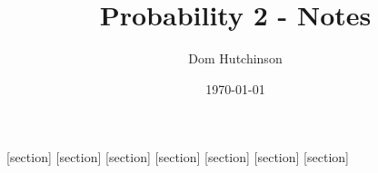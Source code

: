 \documentclass[11pt,a4paper]{article}
\begin{document}
\pagestyle{fancy}
\setlength\parindent{0pt}
\allowdisplaybreaks

\renewcommand{\headrulewidth}{0pt}

\title{Probability 2 - Notes}
\author{Dom Hutchinson}
\date{\today}
\maketitle

\fancyhead[R]{\today}


[section]
[section]
[section]
[section]
[section]
[section]
[section]

\newcommand{\dotprod}[0]{\boldsymbol{\cdot}}
\newcommand{\cosech}[0]{\mathrm{cosech}\ }
\newcommand{\cosec}[0]{\mathrm{cosec}\ }
\newcommand{\sech}[0]{\mathrm{sech}\ }
\newcommand{\expect}[0]{\mathbb{E}}
\newcommand{\nats}[0]{\mathbb{N}}
\newcommand{\prob}[0]{\mathbb{P}}
\newcommand{\reals}[0]{\mathbb{R}}
\newcommand{\sigmafield}[0]{\mathcal{F}}
\newcommand{\nb}[0]{\underline{N.B.} -}
\newcommand{\ie}[0]{\textit{i.e. }}
\newcommand{\eg}[0]{\textit{e.g. }}

\newcommand{\definition}[1]{\stepcounter{definition} \textbf{Definition \arabic{section}.\arabic{definition}\ - }\textit{#1}\\}
\newcommand{\example}[1]{\stepcounter{example} \textbf{Example \arabic{section}.\arabic{example}\ - }\textit{#1}\\}
\newcommand{\notation}[1]{\stepcounter{notation} \textbf{Notation \arabic{section}.\arabic{notation}\ - }\textit{#1}\\}
\newcommand{\proof}[1]{\stepcounter{proof} \textbf{Proof \arabic{section}.\arabic{proof}\ - }\textit{#1}\\}
\newcommand{\Proof}[1]{\stepcounter{proof} \textbf{Proof \arabic{section}.\arabic{proof}\ - }\textit{#1}}
\newcommand{\proposition}[1]{\stepcounter{proposition} \textbf{Proposition \arabic{section}.\arabic{proposition}\ - }\textit{#1}\\}
\newcommand{\remark}[1]{\stepcounter{remark} \textbf{Remark \arabic{section}.\arabic{remark}\ - }\textit{#1}\\}
\newcommand{\theorem}[1]{\stepcounter{theorem} \textbf{Theorem \arabic{section}.\arabic{theorem}\ - }\textit{#1}\\}
\newcommand{\Theorem}[1]{\stepcounter{theorem} \textbf{Theorem \arabic{section}.\arabic{theorem}\ - }\textit{#1}}
\end{document}
